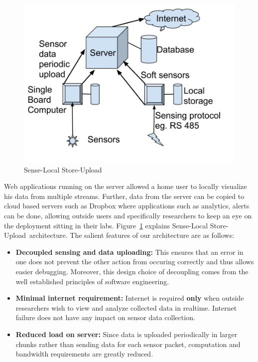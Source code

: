 \documentclass[10pt]{sensys-proc}
\newcommand{\figref}[1]{Figure~\ref{#1}}
\newcommand{\paradigm}{Sense-Local Store-Upload}
\newcommand{\paradigms}{Sense-Local Store-Upload~}
\begin{document}
\begin{figure}     
    \includegraphics[scale=0.20]{./figures/architecture.jpg}    
    \caption{\paradigm}   
    \label{fig:architecture}   
\end{figure}

Web applications running on the server allowed a home user to locally visualize his data from multiple streams. Further, data from the server can be copied to cloud based servers such as Dropbox where applications such as analytics, alerts can be done, allowing outside users and specifically researchers to keep an eye on the deployment sitting in their labs. \figref{fig:architecture} explains \paradigms architecture. The salient features of our architecture are as follows:
\begin{itemize}
\item \textbf{Decoupled sensing and data uploading:} This ensures that an error in one does not prevent the other action from occuring correctly and thus allows easier debugging. Moreover, this design choice of decoupling comes from the well established principles of software engineering.
\item \textbf{Minimal internet requirement:} Internet is required \textbf{only} when outside researchers wish to view and analyze collected data in realtime. Internet failure does not have any impact on sensor data collection.
\item \textbf{Reduced load on server:} Since data is uploaded periodically in larger chunks rather than sending data for each sensor packet, computation and bandwidth requirements are greatly reduced.
\end{itemize}
\end{document}
